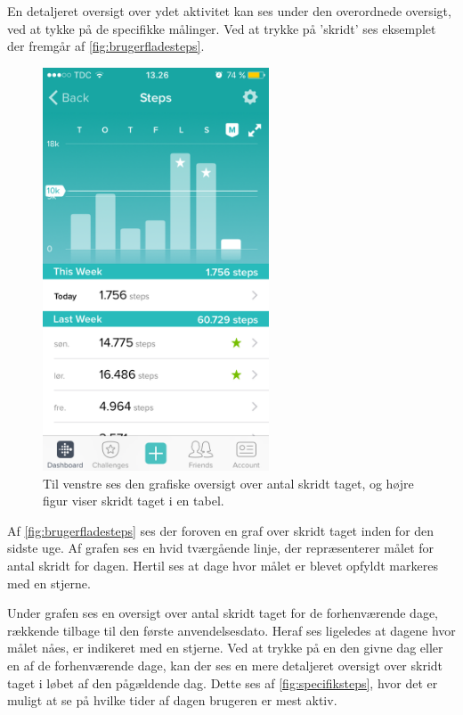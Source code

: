 En detaljeret oversigt over ydet aktivitet kan ses under den overordnede oversigt, ved at tykke på de specifikke målinger. Ved at trykke på 'skridt' ses eksemplet der fremgår af \autoref{fig:brugerfladesteps}.  

\begin{figure}[H]
	\centering
	\includegraphics[width=0.6\textwidth]{figures/brugerfladesteps}
	\caption{Til venstre ses den grafiske oversigt over antal skridt taget, og højre figur viser skridt taget i en tabel.}
	\label{fig:brugerfladesteps}
\end{figure}

Af \autoref{fig:brugerfladesteps} ses der foroven en graf over skridt taget inden for den sidste uge. Af grafen ses en hvid tværgående linje, der repræsenterer målet for antal skridt for dagen. Hertil ses at dage hvor målet er blevet opfyldt markeres med en stjerne.  

Under grafen ses en oversigt over antal skridt taget for de forhenværende dage, rækkende tilbage til den første anvendelsesdato. Heraf ses ligeledes at dagene hvor målet nåes, er indikeret med en stjerne. Ved at trykke på en den givne dag eller en af de forhenværende dage, kan der ses en mere detaljeret oversigt over skridt taget i løbet af den pågældende dag. Dette ses af \autoref{fig:specifiksteps}, hvor det er muligt at se på hvilke tider af dagen brugeren er mest aktiv.  

